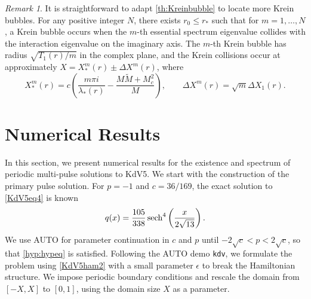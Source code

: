 \documentclass[10pt,reqno]{amsart}
\theoremstyle{plain}
\theoremstyle{definition}
\theoremstyle{remark}
\newtheorem{remark}[theorem]{Remark}
\numberwithin{theorem}{section}
\numberwithin{equation}{section}
\begin{document}
\begin{remark}\label{remark:kreinbubbles}
It is straightforward to adapt \cref{th:Kreinbubble} to locate more Krein bubbles. For any positive integer $N$, there exists $r_0 \leq r_*$ such that for $m = 1, \dots, N$, a Krein bubble occurs when the $m$-th essential spectrum eigenvalue collides with the interaction eigenvalue on the imaginary axis. The $m$-th Krein bubble has radius $\sqrt{T_1(r) / m}$ in the complex plane, and the Krein collisions occur at approximately $X = X^m_*(r) \pm \Delta X^m(r)$, where 
\[
X^m_*(r) = c \left( \frac{m \pi i}{\lambda_*(r)} - \frac{M \tilde{M} + M_c^2 }{M}\right), \qquad \Delta X^m(r) = \sqrt{m} \Delta X_1(r).
\]
\end{remark}

\section{Numerical Results}\label{sec:numerics}

In this section, we present numerical results for the existence and spectrum of periodic multi-pulse solutions to KdV5. We start with the construction of the primary pulse solution. For $p = -1$ and $c = 36/169$, the exact solution to \cref{KdV5eq4} is known \cite[(3)]{Pelinovsky2007}
\begin{equation}\label{KdV5exactsol}
q(x) = \frac{105}{338}\mathop\mathrm{sech}\nolimits^4\left(\frac{x}{2\sqrt{13}} \right).
\end{equation}
We use AUTO for parameter continuation in $c$ and $p$ until $-2 \sqrt{c} < p < 2 \sqrt{c}$, so that \cref{hyp:hypeq} is satisfied. Following the AUTO demo \texttt{kdv}, we formulate the problem using \cref{KdV5ham2} with a small parameter $\epsilon$ to break the Hamiltonian structure. We impose periodic boundary conditions and rescale the domain from $[-X, X]$ to $[0, 1]$, using the domain size $X$ as a parameter. 
\end{document}
